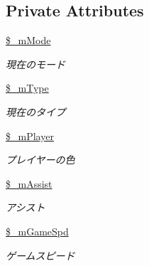 \subsection*{Private Attributes}
\begin{DoxyCompactItemize}
\item 
\mbox{\label{class_reversi_setting_ab2c22d6906c36abfd54afdfa293c60d3}} 
\hyperlink{class_reversi_setting_ab2c22d6906c36abfd54afdfa293c60d3}{\$\+\_\+m\+Mode}
\begin{DoxyCompactList}\small\item\em 現在のモード \end{DoxyCompactList}\item 
\mbox{\label{class_reversi_setting_ad08340b850f9df7dbdac88cfa433540b}} 
\hyperlink{class_reversi_setting_ad08340b850f9df7dbdac88cfa433540b}{\$\+\_\+m\+Type}
\begin{DoxyCompactList}\small\item\em 現在のタイプ \end{DoxyCompactList}\item 
\mbox{\label{class_reversi_setting_a0e894bb84d15c54a99b589bed9810219}} 
\hyperlink{class_reversi_setting_a0e894bb84d15c54a99b589bed9810219}{\$\+\_\+m\+Player}
\begin{DoxyCompactList}\small\item\em プレイヤーの色 \end{DoxyCompactList}\item 
\mbox{\label{class_reversi_setting_abbf625c7eb110bcefecf118d8ee7f10b}} 
\hyperlink{class_reversi_setting_abbf625c7eb110bcefecf118d8ee7f10b}{\$\+\_\+m\+Assist}
\begin{DoxyCompactList}\small\item\em アシスト \end{DoxyCompactList}\item 
\mbox{\label{class_reversi_setting_ab9e6faf17330cd3e036bb0fc4274ba57}} 
\hyperlink{class_reversi_setting_ab9e6faf17330cd3e036bb0fc4274ba57}{\$\+\_\+m\+Game\+Spd}
\begin{DoxyCompactList}\small\item\em ゲームスピード \end{DoxyCompactList}\item 

\end{DoxyCompactItemize}
